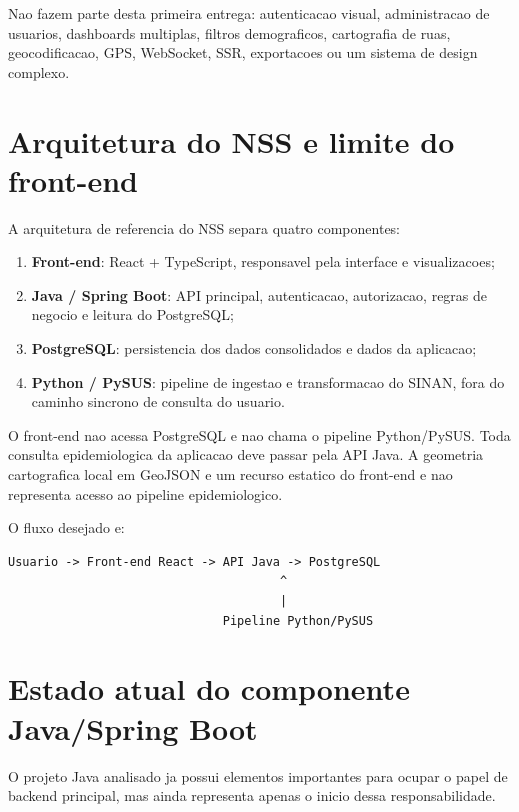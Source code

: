 \documentclass[12pt,a4paper]{article}
\begin{document}
Nao fazem parte desta primeira entrega: autenticacao visual, administracao de usuarios, dashboards multiplas, filtros demograficos, cartografia de ruas, geocodificacao, GPS, WebSocket, SSR, exportacoes ou um sistema de design complexo.

\section{Arquitetura do NSS e limite do front-end}

A arquitetura de referencia do NSS separa quatro componentes:

\begin{enumerate}[leftmargin=*]
    \item \textbf{Front-end}: React + TypeScript, responsavel pela interface e visualizacoes;
    \item \textbf{Java / Spring Boot}: API principal, autenticacao, autorizacao, regras de negocio e leitura do PostgreSQL;
    \item \textbf{PostgreSQL}: persistencia dos dados consolidados e dados da aplicacao;
    \item \textbf{Python / PySUS}: pipeline de ingestao e transformacao do SINAN, fora do caminho sincrono de consulta do usuario.
\end{enumerate}

\begin{decision}
O front-end nao acessa PostgreSQL e nao chama o pipeline Python/PySUS. Toda consulta epidemiologica da aplicacao deve passar pela API Java. A geometria cartografica local em GeoJSON e um recurso estatico do front-end e nao representa acesso ao pipeline epidemiologico.
\end{decision}

O fluxo desejado e:

\begin{lstlisting}
Usuario -> Front-end React -> API Java -> PostgreSQL
                                      ^
                                      |
                              Pipeline Python/PySUS
\end{lstlisting}

\section{Estado atual do componente Java/Spring Boot}

O projeto Java analisado ja possui elementos importantes para ocupar o papel de backend principal, mas ainda representa apenas o inicio dessa responsabilidade.
\end{document}
